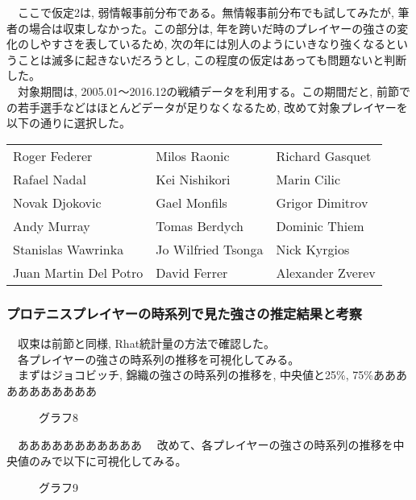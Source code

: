 \documentclass[uplatex,9pt,a5j]{jsarticle}
\begin{document}
　ここで仮定2は, 弱情報事前分布である。無情報事前分布でも試してみたが, 筆者の場合は収束しなかった。この部分は, 年を跨いだ時のプレイヤーの強さの変化のしやすさを表しているため, 次の年には別人のようにいきなり強くなるということは滅多に起きないだろうとし, この程度の仮定はあっても問題ないと判断した。\\
　対象期間は, 2005.01〜2016.12の戦績データを利用する。この期間だと, 前節での若手選手などはほとんどデータが足りなくなるため, 改めて対象プレイヤーを以下の通りに選択した。

\begin{table}[htb]
  \begin{tabular}{lll}
    Roger Federer & Milos Raonic & Richard Gasquet \\
    Rafael Nadal & Kei Nishikori & Marin Cilic \\
    Novak Djokovic & Gael Monfils & Grigor Dimitrov \\
    Andy Murray & Tomas Berdych & Dominic Thiem \\
    Stanislas Wawrinka & Jo Wilfried Tsonga & Nick Kyrgios \\
    Juan Martin Del Potro & David Ferrer & Alexander Zverev \\
  \end{tabular}
\end{table}

\subsubsection{プロテニスプレイヤーの時系列で見た強さの推定結果と考察}

　収束は前節と同様, Rhat統計量の方法で確認した。\\
　各プレイヤーの強さの時系列の推移を可視化してみる。\\
　まずはジョコビッチ, 錦織の強さの時系列の推移を, 中央値と25\%, 75\%あああああああああああ

\begin{figure}[htbp]
  \begin{center}
    \caption{グラフ8}
  \end{center}
\end{figure}

　あああああああああああ
　改めて、各プレイヤーの強さの時系列の推移を中央値のみで以下に可視化してみる。

\begin{figure}[htbp]
  \begin{center}
    \caption{グラフ9}
  \end{center}
\end{figure}
\end{document}
